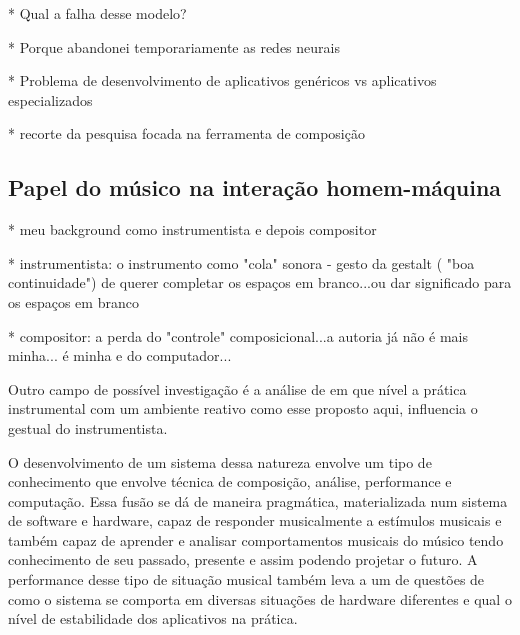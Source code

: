 \documentclass{ppgmus}
\begin{document}
* Qual a falha desse modelo?

* Porque abandonei temporariamente as redes neurais

* Problema de desenvolvimento de aplicativos genéricos vs aplicativos especializados

* recorte da pesquisa focada na ferramenta de composição 


% 
% 
% 
% 
 



\subsection{Papel do músico na interação homem-máquina}

* meu background como instrumentista e depois compositor

* instrumentista: o instrumento como "cola" sonora - gesto da gestalt ( "boa continuidade") de querer
completar os espaços em branco...ou dar significado para os espaços em branco

* compositor: a perda do "controle" composicional...a autoria já não é mais minha...
é minha e do computador...


Outro campo de possível investigação é a análise de em que
nível a prática instrumental com um ambiente reativo como
esse proposto aqui, influencia o gestual do instrumentista.

O desenvolvimento de um sistema dessa natureza envolve um tipo de conhecimento que envolve técnica de
 composição, análise, performance e computação.
 Essa fusão se dá de maneira pragmática, materializada num sistema de software e hardware, capaz de 
responder musicalmente a estímulos musicais e também capaz de aprender e analisar comportamentos musicais do músico tendo 
conhecimento de seu
passado, presente e assim podendo projetar o futuro. A performance desse tipo de situação musical também leva a um  de questões
de como o sistema se comporta em diversas situações de hardware diferentes e qual 
o nível de estabilidade dos aplicativos na prática.
\end{document}
